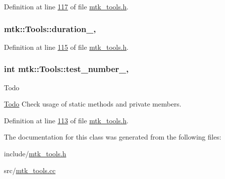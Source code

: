 Definition at line \hyperlink{mtk__tools_8h_source_l00117}{117} of file \hyperlink{mtk__tools_8h_source}{mtk\+\_\+tools.\+h}.

\hypertarget{classmtk_1_1Tools_aba9d3d2952a3de9e7b46faa86d28d692}{
\subsubsection[{duration\+\_\+}]{ mtk\+::\+Tools\+::duration\+\_\+\hspace{0.3cm}{\ttfamily [static]}, {\ttfamily [private]}}}\label{classmtk_1_1Tools_aba9d3d2952a3de9e7b46faa86d28d692}


Definition at line \hyperlink{mtk__tools_8h_source_l00115}{115} of file \hyperlink{mtk__tools_8h_source}{mtk\+\_\+tools.\+h}.

\hypertarget{classmtk_1_1Tools_a04a60458594336ee1badff79b8a9a77f}{
\subsubsection[{test\+\_\+number\+\_\+}]{\setlength{\rightskip}{0pt plus 5cm}int mtk\+::\+Tools\+::test\+\_\+number\+\_\+\hspace{0.3cm}{\ttfamily [static]}, {\ttfamily [private]}}}\label{classmtk_1_1Tools_a04a60458594336ee1badff79b8a9a77f}
\begin{DoxyRefDesc}{Todo}
\item[\hyperlink{todo__todo000019}{Todo}]Check usage of static methods and private members. \end{DoxyRefDesc}


Definition at line \hyperlink{mtk__tools_8h_source_l00113}{113} of file \hyperlink{mtk__tools_8h_source}{mtk\+\_\+tools.\+h}.



The documentation for this class was generated from the following files\+:\begin{DoxyCompactItemize}
\item 
include/\hyperlink{mtk__tools_8h}{mtk\+\_\+tools.\+h}\item 
src/\hyperlink{mtk__tools_8cc}{mtk\+\_\+tools.\+cc}\end{DoxyCompactItemize}
